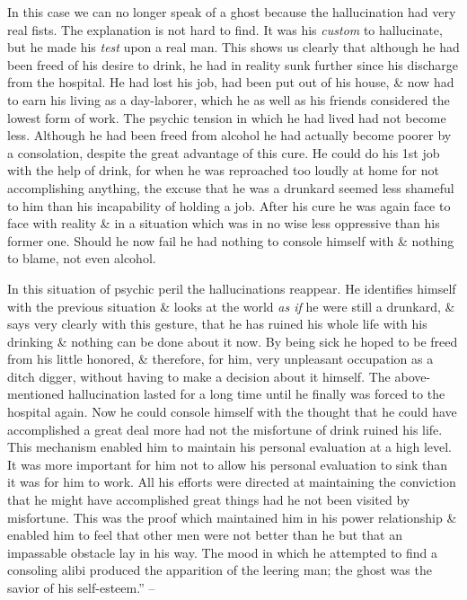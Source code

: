 \documentclass{article}
\begin{document}
In this case we can no longer speak of a ghost because the hallucination had very real fists. The explanation is not hard to find. It was his {\it custom} to hallucinate, but he made his {\it test} upon a real man. This shows us clearly that although he had been freed of his desire to drink, he had in reality sunk further since his discharge from the hospital. He had lost his job, had been put out of his house, \& now had to earn his living as a day-laborer, which he as well as his friends considered the lowest form of work. The psychic tension in which he had lived had not become less. Although he had been freed from alcohol he had actually become poorer by a consolation, despite the great advantage of this cure. He could do his 1st job with the help of drink, for when he was reproached too loudly at home for not accomplishing anything, the excuse that he was a drunkard seemed less shameful to him than his incapability of holding a job. After his cure he was again face to face with reality \& in a situation which was in no wise less oppressive than his former one. Should he now fail he had nothing to console himself with \& nothing to blame, not even alcohol.

In this situation of psychic peril the hallucinations reappear. He identifies himself with the previous situation \& looks at the world {\it as if} he were still a drunkard, \& says very clearly with this gesture, that he has ruined his whole life with his drinking \& nothing can be done about it now. By being sick he hoped to be freed from his little honored, \& therefore, for him, very unpleasant occupation as a ditch digger, without having to make a decision about it himself. The above-mentioned hallucination lasted for a long time until he finally was forced to the hospital again. Now he could console himself with the thought that he could have accomplished a great deal more had not the misfortune of drink ruined his life. This mechanism enabled him to maintain his personal evaluation at a high level. It was more important for him not to allow his personal evaluation to sink than it was for him to work. All his efforts were directed at maintaining the conviction that he might have accomplished great things had he not been visited by misfortune. This was the proof which maintained him in his power relationship \& enabled him to feel that other men were not better than he but that an impassable obstacle lay in his way. The mood in which he attempted to find a consoling alibi produced the apparition of the leering man; the ghost was the savior of his self-esteem.'' -- \cite[pp. 47--57]{Adler_human_nature}
\end{document}
